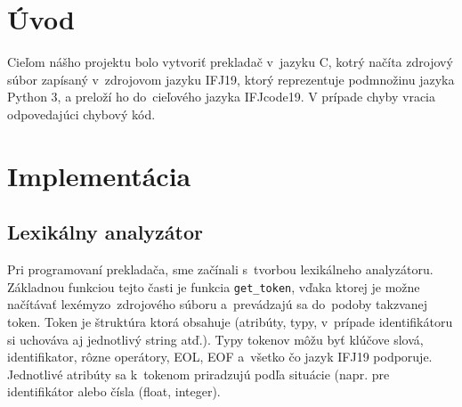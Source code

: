 \documentclass[a4paper, 11pt]{article}
\begin{document}
    \section{Úvod}
    Cieľom nášho projektu bolo vytvoriť prekladač v~jazyku C, kotrý načíta zdrojový súbor zapísaný v~zdrojovom jazyku IFJ19, ktorý reprezentuje podmnožinu jazyka Python 3, a preloží ho do~cieľového jazyka IFJcode19. V prípade chyby vracia odpovedajúci chybový kód.
    
    \section{Implementácia}
    
    \begin{figure}[h]
		\centering
	\end{figure}
    
    \subsection{Lexikálny analyzátor}

    Pri programovaní prekladača, sme začínali s~tvorbou lexikálneho analyzátoru. Základnou funkciou tejto časti je funkcia \texttt{get\_token}, vďaka ktorej je možne načítávať lexémy\footnotemark zo~zdrojového súboru a~prevádzajú sa do~podoby takzvanej token. Token je štruktúra ktorá obsahuje (atribúty, typy, v~prípade identifikátoru si uchováva aj jednotlivý string atď.). Typy tokenov môžu byť klúčove slová, identifikator, rôzne operátory, EOL, EOF a~všetko čo jazyk IFJ19 podporuje. Jednotlivé atribúty sa k~tokenom priradzujú podľa situácie (napr. pre identifikátor alebo čísla (float, integer).
    
\end{document}
